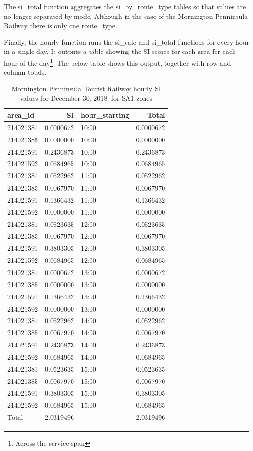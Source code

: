 \documentclass[preprint, 3p,
authoryear]{elsarticle} %
\begin{document}
The si\_total function aggregates the si\_by\_route\_type tables so that
values are no longer separated by mode. Although in the case of the
Mornington Penninsula Railway there is only one route\_type.

Finally, the hourly function runs the si\_calc and si\_total functions
for every hour in a single day. It outputs a table showing the SI scores
for each area for each hour of the day\footnote{Across the service span}.
The below table shows this output, together with row and column totals.

\begin{table}

\caption{\label{tab:SI_hourly_mornington_20181230}Mornington Penninsula Tourist Railway hourly SI values for December 30, 2018, for SA1 zones}
\centering
\begin{tabular}[t]{l|r|l|r}
\hline
area\_id & SI & hour\_starting & Total\\
\hline
214021381 & 0.0000672 & 10:00 & 0.0000672\\
\hline
214021385 & 0.0000000 & 10:00 & 0.0000000\\
\hline
214021591 & 0.2436873 & 10:00 & 0.2436873\\
\hline
214021592 & 0.0684965 & 10:00 & 0.0684965\\
\hline
214021381 & 0.0522962 & 11:00 & 0.0522962\\
\hline
214021385 & 0.0067970 & 11:00 & 0.0067970\\
\hline
214021591 & 0.1366432 & 11:00 & 0.1366432\\
\hline
214021592 & 0.0000000 & 11:00 & 0.0000000\\
\hline
214021381 & 0.0523635 & 12:00 & 0.0523635\\
\hline
214021385 & 0.0067970 & 12:00 & 0.0067970\\
\hline
214021591 & 0.3803305 & 12:00 & 0.3803305\\
\hline
214021592 & 0.0684965 & 12:00 & 0.0684965\\
\hline
214021381 & 0.0000672 & 13:00 & 0.0000672\\
\hline
214021385 & 0.0000000 & 13:00 & 0.0000000\\
\hline
214021591 & 0.1366432 & 13:00 & 0.1366432\\
\hline
214021592 & 0.0000000 & 13:00 & 0.0000000\\
\hline
214021381 & 0.0522962 & 14:00 & 0.0522962\\
\hline
214021385 & 0.0067970 & 14:00 & 0.0067970\\
\hline
214021591 & 0.2436873 & 14:00 & 0.2436873\\
\hline
214021592 & 0.0684965 & 14:00 & 0.0684965\\
\hline
214021381 & 0.0523635 & 15:00 & 0.0523635\\
\hline
214021385 & 0.0067970 & 15:00 & 0.0067970\\
\hline
214021591 & 0.3803305 & 15:00 & 0.3803305\\
\hline
214021592 & 0.0684965 & 15:00 & 0.0684965\\
\hline
Total & 2.0319496 & - & 2.0319496\\
\hline
\end{tabular}
\end{table}
\end{document}
